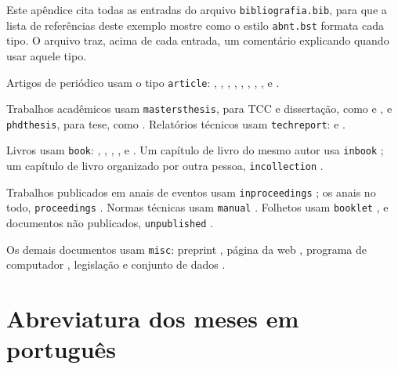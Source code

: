 \documentclass[diss,capa]{texufpel}
\begin{document}
Este apêndice cita todas as entradas do arquivo \texttt{bibliografia.bib},
para que a lista de referências deste exemplo mostre como o estilo
\texttt{abnt.bst} formata cada tipo. O arquivo traz, acima de cada entrada, um
comentário explicando quando usar aquele tipo.

Artigos de periódico usam o tipo \texttt{article}:
\citet{Turing:1937:OCN}, \citet{Turing:1950:CMI}, \citet{Shannon:1948:MTC},
\citet{Dijkstra:1959:NTP}, \citet{Dijkstra:1968:GTS}, \citet{Hoare:1969:ABC},
\citet{Codd:1970:RMD}, \citet{Lamport:1978:TCO},
\citet{Dantzig:1959:TDP} e \citet{Solomon:1987:AVR}.

Trabalhos acadêmicos usam \texttt{mastersthesis}, para TCC e dissertação, como
\citet{Cruz:2015:FCS} e \citet{Shannon:1940:SAR}, e \texttt{phdthesis}, para
tese, como \citet{Turing:1938:SLO}. Relatórios técnicos usam
\texttt{techreport}: \citet{vonNeumann:1945:FDR} e \citet{Postel:1981:IP}.

Livros usam \texttt{book}: \citet{vonNeumann:1966:TSR},
\citet{Knuth:1997:ACP}, \citet{Cormen:2022:IA}, \citet{Brooks:1975:MMM},
\citet{Abelson:1996:SIC} e \citet{Moore:1979:MAI}. Um capítulo de livro do
mesmo autor usa \texttt{inbook} \citep{Knuth:1997:IS}; um capítulo de livro
organizado por outra pessoa, \texttt{incollection}
\citep{vonNeumann:1951:GLT}.

Trabalhos publicados em anais de eventos usam \texttt{inproceedings}
\citep{Cook:1971:CTP}; os anais no todo, \texttt{proceedings}
\citep{ACM:1971:STOC}. Normas técnicas usam \texttt{manual}
\citep{ABNT:2018:NBR6023}. Folhetos usam \texttt{booklet}
\citep{Zorzo:2017:RFC}, e documentos não publicados, \texttt{unpublished}
\citep{Dijkstra:1988:CRT}.

Os demais documentos usam \texttt{misc}: preprint
\citep{Vaswani:2017:AIA}, página da web \citep{ACM:2026:TA}, programa de
computador \citep{Aguiar:2026:TEX}, legislação \citep{Brasil:2015:LBI} e
conjunto de dados \citep{Fisher:1936:IRI}.

\anexos

\chapter{Abreviatura dos meses em português}
\label{anx:meses}
\end{document}
